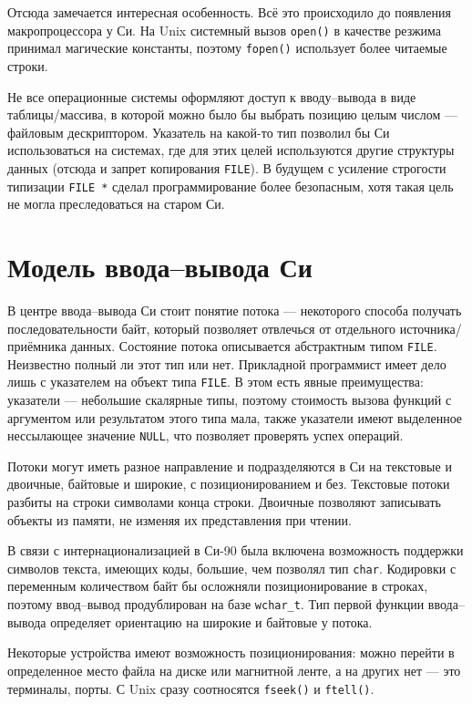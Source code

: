 \documentclass{article}
\begin{document}
Отсюда замечается интересная особенность. Всё это происходило до
появления макропроцессора у Си. На Unix системный вызов
\lstinline{open()} в качестве резжима принимал магические константы,
поэтому \lstinline{fopen()} использует более читаемые
строки.

Не все операционные системы оформляют доступ к вводу--вывода в виде
таблицы/массива, в которой можно было бы выбрать позицию целым числом
--- файловым дескриптором. Указатель на какой-то тип позволил бы Си
использоваться на системах, где для этих целей используются другие
структуры данных (отсюда и запрет копирования \lstinline{FILE}). В
будущем с усиление строгости типизации \lstinline{FILE *} сделал
программирование более безопасным, хотя такая цель не могла
преследоваться на старом Си.

\section{Модель ввода--вывода Си}
В центре ввода--вывода Си стоит понятие потока --- некоторого способа
получать последовательности байт, который позволяет отвлечься от
отдельного источника/приёмника данных. Состояние потока описывается
абстрактным типом \lstinline{FILE}. Неизвестно полный ли этот тип или
нет. Прикладной программист имеет дело лишь с указателем на объект
типа \lstinline{FILE}. В этом есть явные преимущества: указатели ---
небольшие скалярные типы, поэтому стоимость вызова функций с
аргументом или результатом этого типа мала, также указатели имеют
выделенное нессылающее значение \lstinline{NULL}, что позволяет
проверять успех операций.

Потоки могут иметь разное направление и подразделяются в Си на
текстовые и двоичные, байтовые и широкие, с позиционированием и
без. Текстовые потоки разбиты на строки символами конца
строки. Двоичные позволяют записывать объекты из памяти, не изменяя их
представления при чтении.

В связи с интернационализацией в Си-90 была включена возможность
поддержки символов текста, имеющих коды, большие, чем позволял тип
\lstinline{char}. Кодировки с переменным количеством байт бы осложняли
позиционирование в строках, поэтому ввод--вывод продублирован на базе
\lstinline{wchar_t}. Тип первой функции ввода--вывода определяет
ориентацию на широкие и байтовые у потока.

Некоторые устройства имеют возможность позиционирования: можно перейти
в определенное место файла на диске или магнитной ленте, а на других нет
--- это терминалы, порты. С Unix сразу соотносятся \lstinline{fseek()}
и \lstinline{ftell()}.
\end{document}

